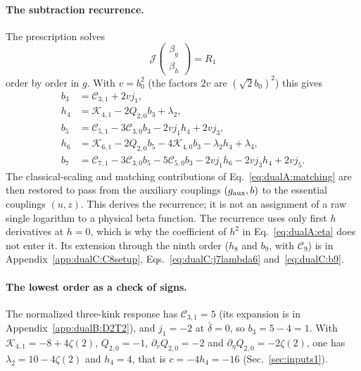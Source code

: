\documentclass[11pt,a4paper]{article}
\numberwithin{equation}{section}
\newcommand{\db}{\bar\delta}
\begin{document}
\paragraph{The subtraction recurrence.} The prescription solves
\begin{equation}
 \mathcal J\begin{pmatrix}\beta_g\\ \beta_h\end{pmatrix}=R_1
 \label{eq:dualA:system}
\end{equation}
order by order in $g$. With $v=b_0^2$ (the factors $2v$ are $(\sqrt2b_0)^2$) this gives
\begin{equation}
\begin{aligned}
 b_3&=\mathcal C_{3,1}+2vj_1,\\
 h_4&=\mathcal K_{4,1}-2Q_{2,0}b_3+\lambda_2,\\
 b_5&=\mathcal C_{5,1}-3\mathcal C_{3,0}b_3-2vj_1h_4+2vj_3,\\
 h_6&=\mathcal K_{6,1}-2Q_{2,0}b_5-4\mathcal K_{4,0}b_3-\lambda_2h_4+\lambda_4,\\
 b_7&=\mathcal C_{7,1}-3\mathcal C_{3,0}b_5-5\mathcal C_{5,0}b_3-2vj_1h_6-2vj_3h_4+2vj_5.
\end{aligned}
\label{eq:dualA:recurrence}
\end{equation}
The classical-scaling and matching contributions of Eq.~\eqref{eq:dualA:matching} are then restored to pass from the
auxiliary couplings $(g_{\rm aux},b)$ to the essential couplings $(u,z)$. This derives the recurrence; it is not an
assignment of a raw single logarithm to a physical beta function. The recurrence uses only first $h$ derivatives at
$h=0$, which is why the coefficient of $h^2$ in Eq.~\eqref{eq:dualA:eta} does not enter it. Its extension through
the ninth order ($h_8$ and $b_9$, with $\mathcal C_9$) is in Appendix~\ref{app:dualC:C8setup}, Eqs.~\eqref{eq:dualC:j7lambda6} and~\eqref{eq:dualC:b9}.

\paragraph{The lowest order as a check of signs.} The normalized three-kink response has
$\mathcal C_{3,1}=5$ (its expansion is in Appendix~\ref{app:dualB:D2T2}), and $j_1=-2$ at $\db=0$, so
$b_3=5-4=1$. With $\mathcal K_{4,1}=-8+4\zeta(2)$, $Q_{2,0}=-1$, $\partial_vQ_{2,0}=-2$ and
$\partial_\eta Q_{2,0}=-2\zeta(2)$, one has $\lambda_2=10-4\zeta(2)$ and $h_4=4$, that is $c=-4h_4=-16$
(Sec.~\ref{sec:inputs1}).
\end{document}
